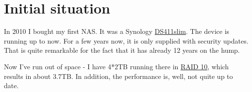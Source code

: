

\section{Initial situation}

In 2010 I bought my first \gls{NAS}. It was a \gls{Synology}
\href{https://global.download.synology.com/download/Document/Hardware/DataSheet/DiskStation/11-year/DS411slim/ger/Synology_DS411slim_Data_Sheet_ger.pdf}{DS411slim}.
The device is running up to now. For a few years now, it is only supplied with
security updates. That is quite remarkable for the fact that it has already 12
years on the hump.
\bigbreak

Now I've run out of space - I have 4*2TB running there in \href{https://en.wikipedia.org/wiki/RAID}{RAID 10},
which results in about 3.7TB. In addition, the performance is, well, not quite up
to date.
